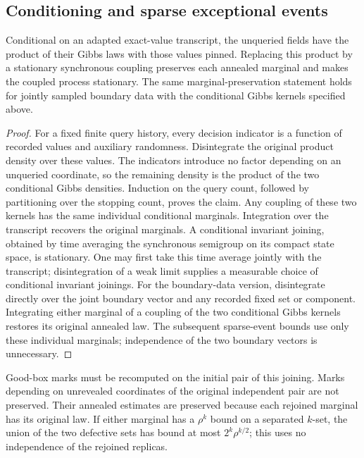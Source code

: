 \subsection{Conditioning and sparse exceptional events}

\begin{lemma}\label{c:freezing}
Conditional on an adapted exact-value transcript, the unqueried fields
have the product of their Gibbs laws with those values pinned. Replacing
this product by a stationary synchronous coupling preserves each
annealed marginal and makes the coupled process stationary.
The same marginal-preservation statement holds for jointly sampled
boundary data with the conditional Gibbs kernels specified above.
\end{lemma}
\begin{proof}
For a fixed finite query history, every decision indicator is a function
of recorded values and auxiliary randomness. Disintegrate the original
product density over these values. The indicators introduce no factor
depending on an unqueried coordinate, so the remaining density is the
product of the two conditional Gibbs densities. Induction on the query
count, followed by partitioning over the stopping count, proves the
claim. Any coupling of these two kernels has the same individual
conditional marginals. Integration over the transcript recovers the
original marginals. A conditional invariant joining, obtained by time
averaging the synchronous semigroup on its compact state space, is
stationary. One may first take this time average jointly with the
transcript; disintegration of a weak limit supplies a measurable choice
of conditional invariant joinings.
For the boundary-data version, disintegrate directly over the joint
boundary vector and any recorded fixed set or component. Integrating
either marginal of a coupling of the two
conditional Gibbs kernels restores its original annealed law. The
subsequent sparse-event bounds use only these individual marginals;
independence of the two boundary vectors is unnecessary.
\end{proof}

Good-box marks must be recomputed on the initial pair of this joining.
Marks depending on unrevealed coordinates of the original independent
pair are not preserved. Their annealed estimates are preserved because
each rejoined marginal has its original law. If either marginal has a
$\rho^k$ bound on a separated $k$-set, the union of the two defective
sets has bound at most $2^k\rho^{k/2}$; this uses no independence of the
rejoined replicas.

